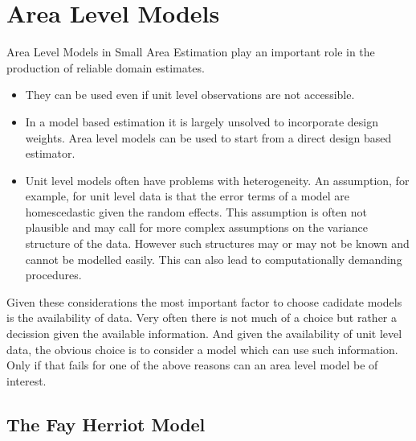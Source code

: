 \section{Area Level Models}\label{area-level-models}

Area Level Models in Small Area Estimation play an important role in the
production of reliable domain estimates.

\begin{itemize}
\itemsep1pt\parskip0pt
\item
  They can be used even if unit level observations are not accessible.
\item
  In a model based estimation it is largely unsolved to incorporate
  design weights. Area level models can be used to start from a direct
  design based estimator.
\item
  Unit level models often have problems with heterogeneity. An
  assumption, for example, for unit level data is that the error terms
  of a model are homescedastic given the random effects. This assumption
  is often not plausible and may call for more complex assumptions on
  the variance structure of the data. However such structures may or may
  not be known and cannot be modelled easily. This can also lead to
  computationally demanding procedures.
\end{itemize}

Given these considerations the most important factor to choose cadidate
models is the availability of data. Very often there is not much of a
choice but rather a decission given the available information. And given
the availability of unit level data, the obvious choice is to consider a
model which can use such information. Only if that fails for one of the
above reasons can an area level model be of interest.

\subsection{The Fay Herriot Model}\label{the-fay-herriot-model}

